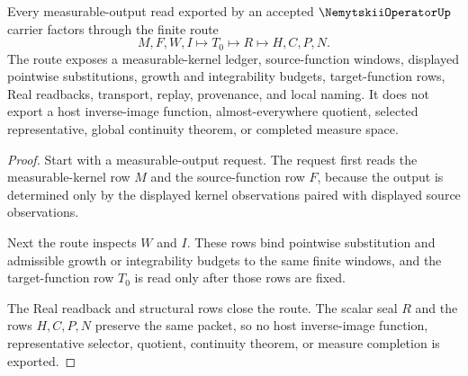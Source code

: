 \begin{theorem}
\label{thm:nemytskii-operator-measurable-handoff}
Every measurable-output read exported by an accepted $\NemytskiiOperatorUp$ carrier factors through the finite route
$$
M,F,W,I \longmapsto T_0 \longmapsto R \longmapsto H,C,P,N.
$$
The route exposes a measurable-kernel ledger, source-function windows, displayed pointwise substitutions, growth and integrability budgets, target-function rows, Real readbacks, transport, replay, provenance, and local naming. It does not export a host inverse-image function, almost-everywhere quotient, selected representative, global continuity theorem, or completed measure space.
\end{theorem}
\begin{proof}
Start with a measurable-output request. The request first reads the measurable-kernel row $M$ and the source-function row $F$, because the output is determined only by the displayed kernel observations paired with displayed source observations.

Next the route inspects $W$ and $I$. These rows bind pointwise substitution and admissible growth or integrability budgets to the same finite windows, and the target-function row $T_0$ is read only after those rows are fixed.

The Real readback and structural rows close the route. The scalar seal $R$ and the rows $H,C,P,N$ preserve the same packet, so no host inverse-image function, representative selector, quotient, continuity theorem, or measure completion is exported.
\end{proof}

